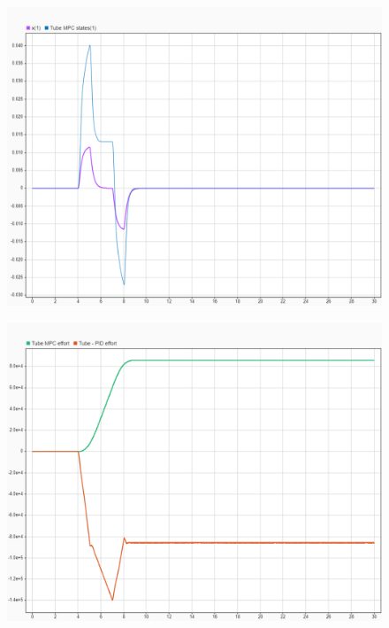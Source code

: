\begin{figure}[h!]
	\centering
	\includegraphics[width=1\linewidth]{../img/23}
	\caption{}
	\label{fig:23}
\end{figure}

\begin{figure}[H]
	\centering
	\includegraphics[width=1\linewidth]{../img/24}
	\caption{}
	\label{fig:24}
\end{figure}

